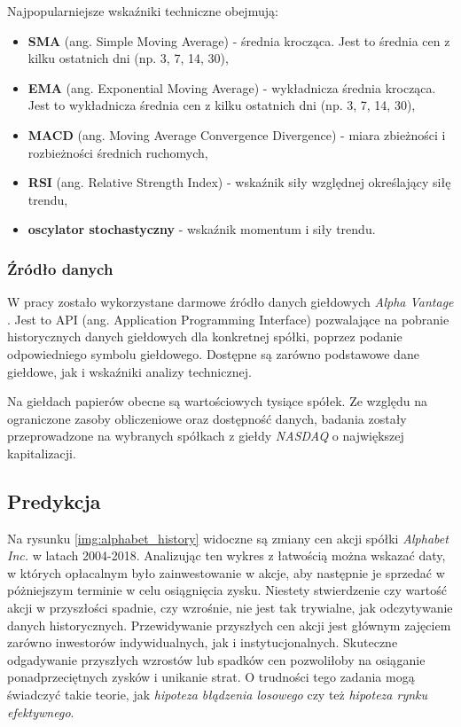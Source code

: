 \documentclass[a4paper, twoside, 11pt, openright]{article}
\begin{document}
Najpopularniejsze wskaźniki techniczne obejmują:
\begin{itemize}
\item{\textbf{SMA} (ang. Simple Moving Average)} - średnia krocząca. Jest to średnia cen z kilku ostatnich dni (np. 3, 7, 14, 30),
\item{\textbf{EMA} (ang. Exponential Moving Average)} - wykładnicza średnia krocząca. Jest to wykładnicza średnia cen z kilku ostatnich dni (np. 3, 7, 14, 30),
\item{\textbf{MACD} (ang. Moving Average Convergence Divergence)} -  miara zbieżności i rozbieżności średnich ruchomych,
\item{\textbf{RSI} (ang. Relative Strength Index)} -  wskaźnik siły względnej określający siłę trendu,
\item{\textbf{oscylator stochastyczny}} -  wskaźnik momentum i siły trendu.
\end{itemize}

\subsubsection{Źródło danych}

W pracy zostało wykorzystane darmowe źródło danych giełdowych \textit{Alpha Vantage} \cite{alphavantage}. Jest to API (ang. Application Programming Interface) pozwalające na pobranie historycznych danych giełdowych dla konkretnej spółki, poprzez podanie odpowiedniego symbolu giełdowego. Dostępne są zarówno podstawowe dane giełdowe, jak i wskaźniki analizy technicznej. 

\bigskip

Na giełdach papierów obecne są wartościowych tysiące spółek. Ze względu na ograniczone zasoby obliczeniowe oraz dostępność danych, badania zostały przeprowadzone na wybranych spółkach z giełdy \textit{NASDAQ} o największej kapitalizacji.

\subsection{Predykcja}

Na rysunku \ref{img:alphabet_history} widoczne są zmiany cen akcji spółki \textit{Alphabet Inc.} w latach 2004-2018. Analizując ten wykres z łatwością można wskazać daty, w których opłacalnym było zainwestowanie w akcje, aby następnie je sprzedać w póżniejszym terminie w celu osiągnięcia zysku. Niestety stwierdzenie czy wartość akcji w przyszłości spadnie, czy wzrośnie, nie jest tak trywialne, jak odczytywanie danych historycznych. Przewidywanie przyszłych cen akcji jest głównym zajęciem zarówno inwestorów indywidualnych, jak i instytucjonalnych. Skuteczne odgadywanie przyszłych wzrostów lub spadków cen pozwoliłoby na osiąganie ponadprzeciętnych zysków i unikanie strat. O trudności tego zadania mogą świadczyć takie teorie, jak \textit{hipoteza błądzenia losowego} czy też \textit{hipoteza rynku efektywnego}.
\end{document}
